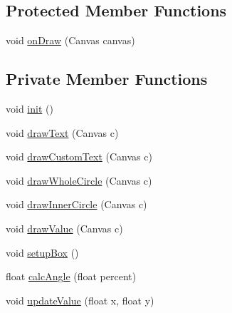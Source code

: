 \subsection*{Protected Member Functions}
\begin{DoxyCompactItemize}
\item 
void \hyperlink{classcs_1_1usense_1_1_circle_display_a30215ee04f4094f1cad57209e516a932}{on\+Draw} (Canvas canvas)
\end{DoxyCompactItemize}
\subsection*{Private Member Functions}
\begin{DoxyCompactItemize}
\item 
void \hyperlink{classcs_1_1usense_1_1_circle_display_a5bcde7629d39266f59aed45f379a98cc}{init} ()
\item 
void \hyperlink{classcs_1_1usense_1_1_circle_display_a6a7a140e9791624c6026afbe4f700bed}{draw\+Text} (Canvas c)
\item 
void \hyperlink{classcs_1_1usense_1_1_circle_display_a62a3e38ab456aab38162bd59aba7caed}{draw\+Custom\+Text} (Canvas c)
\item 
void \hyperlink{classcs_1_1usense_1_1_circle_display_a2ef2aa892a8413ce6e9a9f3448442007}{draw\+Whole\+Circle} (Canvas c)
\item 
void \hyperlink{classcs_1_1usense_1_1_circle_display_ab4f7a6396841a714f83132623d686842}{draw\+Inner\+Circle} (Canvas c)
\item 
void \hyperlink{classcs_1_1usense_1_1_circle_display_a6915c87060235a4465f8a266d5f711f5}{draw\+Value} (Canvas c)
\item 
void \hyperlink{classcs_1_1usense_1_1_circle_display_af3bf65d64ad48c9d4741fba149c9885e}{setup\+Box} ()
\item 
float \hyperlink{classcs_1_1usense_1_1_circle_display_a5de7b711f98d6d46e97c3ebbb8f5b23f}{calc\+Angle} (float percent)
\item 
void \hyperlink{classcs_1_1usense_1_1_circle_display_a4db67899da0281d01bc5c90faa788539}{update\+Value} (float x, float y)
\end{DoxyCompactItemize}
